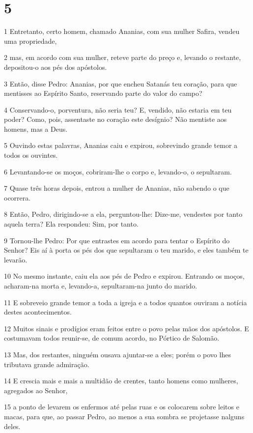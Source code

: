 \chapter{5}

\par 1 Entretanto, certo homem, chamado Ananias, com sua mulher Safira, vendeu uma propriedade,
\par 2 mas, em acordo com sua mulher, reteve parte do preço e, levando o restante, depositou-o aos pés dos apóstolos.
\par 3 Então, disse Pedro: Ananias, por que encheu Satanás teu coração, para que mentisses ao Espírito Santo, reservando parte do valor do campo?
\par 4 Conservando-o, porventura, não seria teu? E, vendido, não estaria em teu poder? Como, pois, assentaste no coração este desígnio? Não mentiste aos homens, mas a Deus.
\par 5 Ouvindo estas palavras, Ananias caiu e expirou, sobrevindo grande temor a todos os ouvintes.
\par 6 Levantando-se os moços, cobriram-lhe o corpo e, levando-o, o sepultaram.
\par 7 Quase três horas depois, entrou a mulher de Ananias, não sabendo o que ocorrera.
\par 8 Então, Pedro, dirigindo-se a ela, perguntou-lhe: Dize-me, vendestes por tanto aquela terra? Ela respondeu: Sim, por tanto.
\par 9 Tornou-lhe Pedro: Por que entrastes em acordo para tentar o Espírito do Senhor? Eis aí à porta os pés dos que sepultaram o teu marido, e eles também te levarão.
\par 10 No mesmo instante, caiu ela aos pés de Pedro e expirou. Entrando os moços, acharam-na morta e, levando-a, sepultaram-na junto do marido.
\par 11 E sobreveio grande temor a toda a igreja e a todos quantos ouviram a notícia destes acontecimentos.
\par 12 Muitos sinais e prodígios eram feitos entre o povo pelas mãos dos apóstolos. E costumavam todos reunir-se, de comum acordo, no Pórtico de Salomão.
\par 13 Mas, dos restantes, ninguém ousava ajuntar-se a eles; porém o povo lhes tributava grande admiração.
\par 14 E crescia mais e mais a multidão de crentes, tanto homens como mulheres, agregados ao Senhor,
\par 15 a ponto de levarem os enfermos até pelas ruas e os colocarem sobre leitos e macas, para que, ao passar Pedro, ao menos a sua sombra se projetasse nalguns deles.
